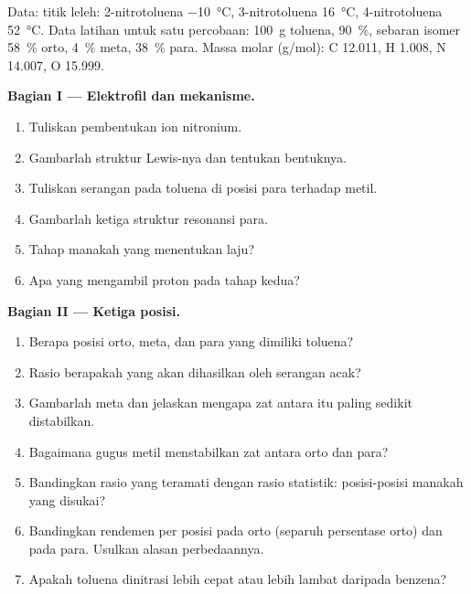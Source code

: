 \begin{problem}
\label{pb:b2:aromatic-substitution:1}
Data: titik leleh: 2-nitrotoluena \qty{-10}{\degreeCelsius}, 3-nitrotoluena
\qty{16}{\degreeCelsius}, 4-nitrotoluena \qty{52}{\degreeCelsius}. Data latihan
untuk satu percobaan: \qty{100}{g} toluena,  90~\%, sebaran isomer
58~\% orto, 4~\% meta, 38~\% para. Massa molar (\unit{g/mol}): C 12.011,
H 1.008, N 14.007, O 15.999.

\medskip
\noindent\textbf{Bagian I --- Elektrofil dan mekanisme.}
\begin{enumerate}
  \item Tuliskan pembentukan ion nitronium.
  \item Gambarlah struktur Lewis-nya dan tentukan bentuknya.
  \item Tuliskan serangan  pada toluena di posisi para terhadap metil.
  \item Gambarlah ketiga struktur resonansi  para.
  \item Tahap manakah yang menentukan laju?
  \item Apa yang mengambil proton pada tahap kedua?
\end{enumerate}

\medskip
\noindent\textbf{Bagian II --- Ketiga posisi.}
\begin{enumerate}[resume]
  \item Berapa posisi orto, meta, dan para yang dimiliki toluena?
  \item Rasio berapakah yang akan dihasilkan oleh serangan acak?
  \item Gambarlah  meta dan jelaskan mengapa zat antara itu
        paling sedikit distabilkan.
  \item Bagaimana gugus metil menstabilkan zat antara orto dan para?
  \item Bandingkan rasio yang teramati dengan rasio statistik: posisi-posisi
        manakah yang disukai?
  \item Bandingkan rendemen per posisi pada orto (separuh persentase orto) dan
        pada para. Usulkan alasan perbedaannya.
  \item Apakah toluena dinitrasi lebih cepat atau lebih lambat daripada benzena?
\end{enumerate}


\end{problem}
